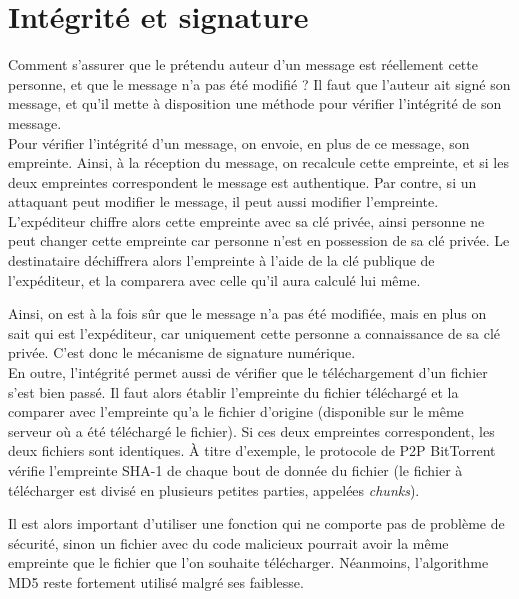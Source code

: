 
\section{Intégrité et signature}
Comment s'assurer que le prétendu auteur d'un message est
réellement cette personne, et que le message n'a pas été modifié ?
Il faut que l'auteur ait signé son message, et qu'il mette à
disposition une méthode pour vérifier l'intégrité de son message.
\\

Pour vérifier l'intégrité d'un message, on envoie, en plus de ce
message, son empreinte. Ainsi, à la réception du
message, on recalcule cette empreinte, et si les deux empreintes
correspondent le message est
authentique. Par contre, si un attaquant peut modifier le message,
il peut aussi modifier l'empreinte. L'expéditeur chiffre
alors cette empreinte avec sa clé privée, ainsi personne ne peut
changer cette empreinte car personne n'est en possession de sa clé
privée. Le destinataire déchiffrera alors l'empreinte à l'aide de
la clé publique de l'expéditeur, et la comparera avec celle qu'il
aura calculé lui même.

Ainsi, on est à la fois sûr que le message n'a pas été modifiée,
mais en plus on sait qui est l'expéditeur, car uniquement cette
personne a connaissance de sa clé privée. C'est donc le mécanisme
de signature numérique.
\\

En outre, l'intégrité permet aussi de vérifier que le
téléchargement d'un fichier s'est bien passé. Il faut alors
établir 
l'empreinte du fichier téléchargé et la comparer avec l'empreinte
qu'a le fichier d'origine (disponible sur le même serveur où a été 
téléchargé le fichier). Si ces deux empreintes correspondent, les
deux fichiers sont identiques. À titre d'exemple, le protocole
de P2P BitTorrent vérifie l'empreinte SHA-1 de chaque bout de donnée
du fichier 
(le fichier à télécharger est divisé en plusieurs petites parties, 
appelées \emph{chunks}).  

Il est alors important d'utiliser une fonction qui ne comporte pas
de problème de sécurité, sinon un fichier avec du code malicieux
pourrait avoir la même empreinte que le fichier que l'on souhaite
télécharger. Néanmoins, l'algorithme MD5 reste fortement utilisé
malgré ses faiblesse.

